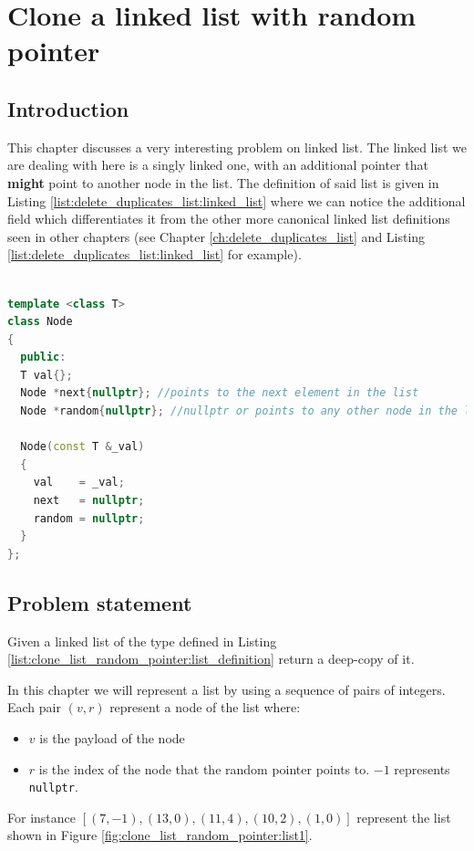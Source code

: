 %

\chapter{Clone a linked list with random pointer}
\label{ch:clone_list_random_pointer}
\section*{Introduction}
This chapter discusses a very interesting problem on linked list.
The linked list we are dealing with here is a singly linked one, with an additional pointer that \textbf{might} point to another node in the list. The \CC definition of said list is given in Listing \ref{list:delete_duplicates_list:linked_list} where we can notice the additional field  which differentiates it from the other more canonical linked list definitions seen in other chapters (see Chapter \ref{ch:delete_duplicates_list} and Listing \ref{list:delete_duplicates_list:linked_list} for example).

\begin{lstlisting}[language=c++, caption={Definition of a linked list with a random pointer.},label=list:delete_duplicates_list:linked_list]

template <class T> 
class Node
{
  public:
  T val{};
  Node *next{nullptr}; //points to the next element in the list
  Node *random{nullptr}; //nullptr or points to any other node in the list.

  Node(const T &_val)
  {
    val    = _val;
    next   = nullptr;
    random = nullptr;
  }
};
\end{lstlisting}

\section{Problem statement}
\begin{exercise}
Given a linked list of the type defined in Listing \ref{list:clone_list_random_pointer:list_definition} return a deep-copy of it.
\end{exercise}


In this chapter we will represent a list by using a sequence of pairs of integers. Each pair $(v,r)$ represent a node of the list where:
\begin{itemize}
	\item $v$ is the payload of the node
	\item $r$ is the index of the node that the random pointer points to. $-1$ represents \lstinline[columns=fixed]{nullptr}.
\end{itemize} 
For instance $[(7,-1),(13,0),(11,4),(10,2),(1,0)]$ represent the list shown in Figure \ref{fig:clone_list_random_pointer:list1}.

